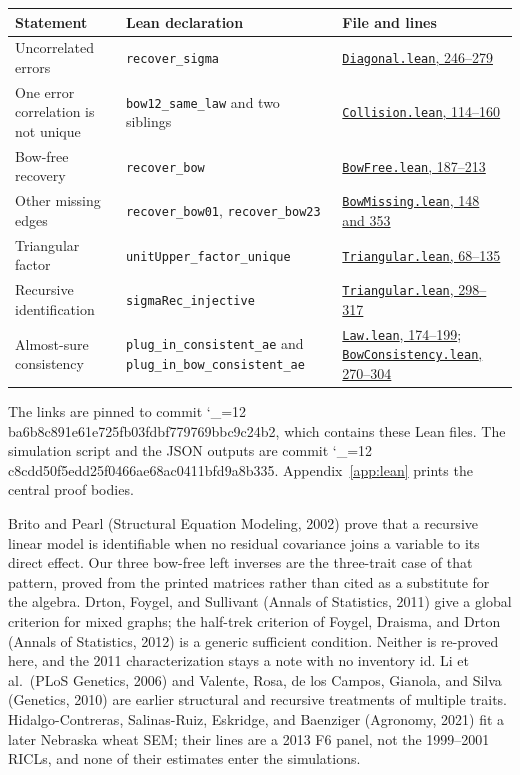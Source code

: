 \documentclass[11pt]{article}
\makeatletter
\newcommand{\sha}{\begingroup\catcode`\_=12 \sha@read}
\newcommand{\sha@read}[1]{\ttfamily\sha@loop#1\relax\endgroup}
\def\sha@loop#1{%
  \ifx\relax#1\else
    #1\allowbreak
    \expandafter\sha@loop
  \fi}
\newcommand{\proofcommit}{1ba6b8c891e61e725fb03fdbf779769bbc9c24b2}
\newcommand{\proofbase}{https://github.com/alectionary/vibe-math/blob/\proofcommit/formalization/correlated-residuals}
\makeatother
\begin{document}
\begin{center}
\footnotesize
\begin{tabular}{@{}p{}p{}p{}@{}}
\toprule
Statement & Lean declaration & File and lines \\
\midrule
Uncorrelated errors & \texttt{recover\_sigma} & \href{\proofbase/CorrelatedResiduals/Diagonal.lean\#L246-L279}{\texttt{Diagonal.lean}, 246--279} \\
One error correlation is not unique & \texttt{bow12\_same\_law} and two siblings & \href{\proofbase/CorrelatedResiduals/Collision.lean\#L114-L160}{\texttt{Collision.lean}, 114--160} \\
Bow-free recovery & \texttt{recover\_bow} & \href{\proofbase/CorrelatedResiduals/BowFree.lean\#L187-L213}{\texttt{BowFree.lean}, 187--213} \\
Other missing edges & \texttt{recover\_bow01}, \texttt{recover\_bow23} & \href{\proofbase/CorrelatedResiduals/BowMissing.lean\#L148}{\texttt{BowMissing.lean}, 148 and 353} \\
Triangular factor & \texttt{unitUpper\_factor\_unique} & \href{\proofbase/CorrelatedResiduals/Triangular.lean\#L68-L135}{\texttt{Triangular.lean}, 68--135} \\
Recursive identification & \texttt{sigmaRec\_injective} & \href{\proofbase/CorrelatedResiduals/Triangular.lean\#L298-L317}{\texttt{Triangular.lean}, 298--317} \\
Almost-sure consistency & \texttt{plug\_in\_consistent\_ae} and \texttt{plug\_in\_bow\_consistent\_ae} & \href{\proofbase/CorrelatedResiduals/Law.lean\#L174-L199}{\texttt{Law.lean}, 174--199}; \href{\proofbase/CorrelatedResiduals/BowConsistency.lean\#L270-L304}{\texttt{BowConsistency.lean}, 270--304} \\
\bottomrule
\end{tabular}
\end{center}

The links are pinned to commit \sha{1ba6b8c891e61e725fb03fdbf779769bbc9c24b2}, which contains these Lean files. The simulation script and the JSON outputs are commit \sha{6c8cdd50f5edd25f0466ae68ac0411bfd9a8b335}. Appendix~\ref{app:lean} prints the central proof bodies.

Brito and Pearl (Structural Equation Modeling, 2002) prove that a recursive
linear model is identifiable when no residual covariance joins a variable to
its direct effect. Our three bow-free left inverses are the three-trait case
of that pattern, proved from the printed matrices rather than cited as a
substitute for the algebra. Drton, Foygel, and Sullivant (Annals of
Statistics, 2011) give a global criterion for mixed graphs; the half-trek
criterion of Foygel, Draisma, and Drton (Annals of Statistics, 2012) is a
generic sufficient condition. Neither is re-proved here, and the 2011
characterization stays a note with no inventory id. Li et al.\ (PLoS
Genetics, 2006) and Valente, Rosa, de los Campos, Gianola, and Silva
(Genetics, 2010) are earlier structural and recursive treatments of multiple
traits. Hidalgo-Contreras, Salinas-Ruiz, Eskridge, and Baenziger (Agronomy,
2021) fit a later Nebraska wheat SEM; their lines are a 2013 F6 panel, not
the 1999--2001 RICLs, and none of their estimates enter the simulations.
\end{document}
